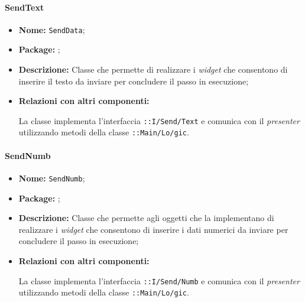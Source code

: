 \paragraph{SendText}
\begin{flushleft}
\begin{itemize}
\item \textbf{Nome:} \texttt{SendData};
\item \textbf{Package:} \texttt{\viewUser{}};
\item \textbf{Descrizione:} Classe che permette di realizzare i \textit{widget} che consentono di inserire il testo da inviare per concludere il passo in esecuzione;
\item \textbf{Relazioni con altri componenti:}
\begin{sloppypar}
La classe implementa l'interfaccia \texttt{\iViewUser{}::I\fshyp{}Send\fshyp{}Text} e comunica con il \textit{presenter} utilizzando metodi della classe \texttt{\logicUser{}::Main\fshyp{}Lo\fshyp{}gic}.
\end{sloppypar}
\end{itemize}
\end{flushleft}

\paragraph{SendNumb}
\begin{flushleft}
\begin{itemize}
\item \textbf{Nome:} \texttt{SendNumb};
\item \textbf{Package:} \texttt{\viewUser{}};
\item \textbf{Descrizione:} Classe che permette agli oggetti che la implementano di realizzare i \textit{widget} che consentono di inserire i dati numerici da inviare per concludere il passo in esecuzione;
\item \textbf{Relazioni con altri componenti:}
\begin{sloppypar}
La classe implementa l'interfaccia \texttt{\iViewUser{}::I\fshyp{}Send\fshyp{}Numb} e comunica con il \textit{presenter} utilizzando metodi della classe \texttt{\logicUser{}::Main\fshyp{}Lo\fshyp{}gic}.
\end{sloppypar}
\end{itemize}
\end{flushleft}


